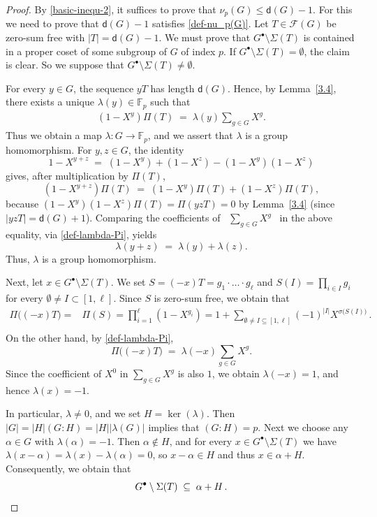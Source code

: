 \documentclass[a4paper, 10pt]{amsart}
\theoremstyle{plain}
\theoremstyle{definition}
\numberwithin{equation}{section}
\begin{document}
\begin{proof}
By \eqref{basic-inequ-2}, it suffices  to prove that
	$\nu_p (G) \le \mathsf{d}(G) - 1$. For this we need to prove that $\mathsf d (G)-1$ satisfies \eqref{def-nu_p(G)}.
Let
	$T \in \mathcal{F}(G)$ be zero-sum free with $|T| = \mathsf d (G) - 1$. We must
	prove that $G^\bullet \setminus \Sigma(T)$ is contained in a proper coset
	of some subgroup of $G$ of index $p$.
	If $G^\bullet \setminus \Sigma(T) = \emptyset$, the
	claim is clear. So we suppose that  $G^\bullet \setminus \Sigma(T) \ne \emptyset$.
	
	For every $y \in G$, the sequence $yT$ has length $\mathsf d (G)$. Hence, by
	Lemma~\ref{3.4}, there exists a unique
	$\lambda(y) \in \mathbb{F}_p$ such that
	\begin{align} \label{def-lambda-Pi}
	(1 - X^y) \Pi(T) \;=\; \lambda(y) \sum_{g \in G} X^g.
	\end{align}
Thus we obtain a map $\lambda \colon  G \to \mathbb{F}_p$, and we assert that 
$\lambda$ is a group homomorphism. For $y, z \in G$, the
	identity
	\[
	1 - X^{y+z} \;=\; (1 - X^y) + (1 - X^z) - (1 - X^y)(1 - X^z)
	\]
	gives, after multiplication by $\Pi(T)$,
	\[
	(1 - X^{y+z}) \Pi(T)
	\;=\;
	(1 - X^y) \Pi(T) + (1 - X^z) \Pi(T),
	\]
	because
	$(1 - X^y)(1 - X^z) \Pi(T) = \Pi(yzT) = 0$ by
	Lemma~\ref{3.4} (since $|yzT| = \mathsf d (G) + 1$). Comparing the
	coefficients of \ $\sum_{g \in G} X^g$ \ in the above equality, via
	\eqref{def-lambda-Pi}, yields
	\[
	\lambda(y + z) \;=\; \lambda(y) + \lambda(z).
	\]
Thus, $\lambda$ is a group homomorphism.
	
Next, let  $x \in G^\bullet \setminus \Sigma(T)$. We set $S = (-x)T=g_1 \cdot \ldots \cdot g_{\ell}$ and $S (I) = \prod_{i \in I} g_i$ for every $\emptyset \ne I \subset [1, \ell]$. Since  $S$ is zero-sum free, we obtain that
\[
\begin{aligned}
\Pi \big( (-x) T \big) = & \Pi (S) = \prod_{i=1}^{\ell} (1 - X^{g_i}) = 1 + \sum_{\emptyset \ne I \subseteq [1, \ell]} (-1)^{|I|} X^{\sigma \big( S (I) \big)} \,.\\
\end{aligned}
\]
On the other hand, by \eqref{def-lambda-Pi},
	\[
	\Pi \big( (-x) T\big) \;=\; \lambda(-x) \sum_{g \in G} X^g.
	\]
	Since the coefficient of $X^0$ in $\sum_{g \in G} X^g$ is also $1$, we
	obtain $\lambda(-x) = 1$, and hence $\lambda(x) = -1$.
	
	In particular, $\lambda \ne 0$, and we set $H = \ker ( \lambda )$. Then  $|G| = |H|(G \colon H) = |H| |\lambda (G)|$ implies that $(G \colon H) = p$. 
Next we choose  any $\alpha \in G$ with
	$\lambda(\alpha) = -1$.
	Then $\alpha \notin H$, and for every $x \in G^\bullet \setminus \Sigma(T)$ we have
	$\lambda(x - \alpha) = \lambda(x) - \lambda(\alpha) = 0$, so
	$x - \alpha \in H$ and thus $x \in \alpha + H$. Consequently, we obtain that
	\[
	G^\bullet \setminus \Sigma(T) \;\subseteq\; \alpha + H \,. \qedhere
	\]
\end{proof}
\end{document}
